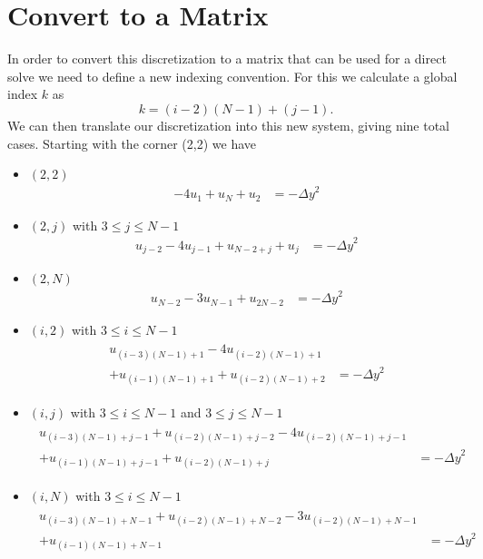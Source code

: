 \documentclass[11pt]{article}
\begin{document}
	\section{Convert to a Matrix}
	In order to convert this discretization to a matrix that can be used for a direct solve we need to define a new indexing convention. For this we calculate a global index $ k $ as
	\begin{equation}
		k = (i-2)(N-1) + (j-1).
	\end{equation}
	We can then translate our discretization into this new system, giving nine total cases. Starting with the corner (2,2) we have
	\begin{itemize}
		\item $ (2,2) $
		\begin{align*}
			- 4u_1 + u_{N} + u_2 &= -{\Delta y}^2
		\end{align*}
		\item $ (2,j) $ with $ 3\leq j\leq N-1 $
		\begin{align*}
			u_{j-2} - 4u_{j-1} + u_{N-2+j} + u_j &= -{\Delta y}^2
		\end{align*}
		\item $ (2,N) $
		\begin{align*}
			u_{N-2} - 3u_{N-1} + u_{2N-2} &= -{\Delta y}^2
		\end{align*}
		\item $ (i,2) $ with $ 3\leq i\leq N-1 $
		\begin{align*}
			\begin{split}
				u_{(i-3)(N-1)+1} - 4u_{(i-2)(N-1)+1} \\+ u_{(i-1)(N-1)+1} + u_{(i-2)(N-1)+2} &= -{\Delta y}^2
			\end{split}
		\end{align*}
		\item $ (i,j) $ with $ 3\leq i\leq N-1 $ and $ 3\leq j\leq N-1 $
		\begin{align*}
			\begin{split}
				u_{(i-3)(N-1)+j-1} + u_{(i-2)(N-1)+j-2} - 4u_{(i-2)(N-1)+j-1}\\ + u_{(i-1)(N-1)+j-1} + u_{(i-2)(N-1)+j}& = -{\Delta y}^2
			\end{split}
		\end{align*}
		\item $ (i,N) $ with $ 3\leq i\leq N-1 $
		\begin{align*}
			\begin{split}
				u_{(i-3)(N-1)+N-1} + u_{(i-2)(N-1)+N-2} - 3u_{(i-2)(N-1)+N-1} \\+ u_{(i-1)(N-1)+N-1} &= -{\Delta y}^2

\end{split}
\end{align*}
\end{itemize}
\end{document}
